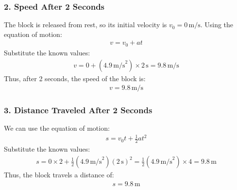 \documentclass[letterpaper,10pt,english]{jupyterBook}
\begin{document}
\subsubsection{2. Speed After 2 Seconds}
\label{\detokenize{prerequisites:speed-after-2-seconds}}
\sphinxAtStartPar
The block is released from rest, so its initial velocity is \( v_0 = 0 \, \text{m/s} \). Using the equation of motion:
\begin{equation*}
\begin{split}
v = v_0 + at
\end{split}
\end{equation*}
\sphinxAtStartPar
Substitute the known values:
\begin{equation*}
\begin{split}
v = 0 + (4.9 \, \text{m/s}^2) \times 2 \, \text{s} = 9.8 \, \text{m/s}
\end{split}
\end{equation*}
\sphinxAtStartPar
Thus, after 2 seconds, the speed of the block is:
\begin{equation*}
\begin{split}
v = 9.8 \, \text{m/s}
\end{split}
\end{equation*}

\subsubsection{3. Distance Traveled After 2 Seconds}
\label{\detokenize{prerequisites:distance-traveled-after-2-seconds}}
\sphinxAtStartPar
We can use the equation of motion:
\begin{equation*}
\begin{split}
s = v_0 t + \frac{1}{2} a t^2
\end{split}
\end{equation*}
\sphinxAtStartPar
Substitute the known values:
\begin{equation*}
\begin{split}
s = 0 \times 2 + \frac{1}{2} (4.9 \, \text{m/s}^2) (2 \, \text{s})^2 = \frac{1}{2} (4.9 \, \text{m/s}^2) \times 4 = 9.8 \, \text{m}
\end{split}
\end{equation*}
\sphinxAtStartPar
Thus, the block travels a distance of:
\begin{equation*}
\begin{split}
s = 9.8 \, \text{m}
\end{split}
\end{equation*}
\end{document}
